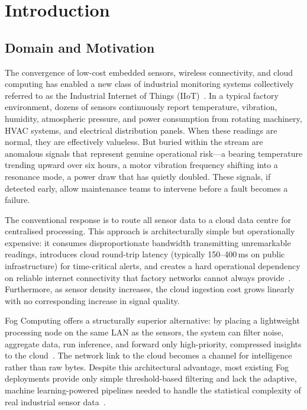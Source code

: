 \documentclass[conference]{IEEEtran}
\begin{document}
\section{Introduction}

\subsection{Domain and Motivation}

The convergence of low-cost embedded sensors, wireless connectivity, and
cloud computing has enabled a new class of industrial monitoring systems
collectively referred to as the Industrial Internet of Things
(IIoT)~\cite{b1}. In a typical factory environment, dozens of sensors
continuously report temperature, vibration, humidity, atmospheric pressure,
and power consumption from rotating machinery, HVAC systems, and electrical
distribution panels. When these readings are normal, they are effectively
valueless. But buried within the stream are anomalous signals that represent
genuine operational risk---a bearing temperature trending upward over six
hours, a motor vibration frequency shifting into a resonance mode, a power
draw that has quietly doubled. These signals, if detected early, allow
maintenance teams to intervene before a fault becomes a failure.

The conventional response is to route all sensor data to a cloud data
centre for centralised processing. This approach is architecturally simple
but operationally expensive: it consumes disproportionate bandwidth transmitting
unremarkable readings, introduces cloud round-trip latency (typically
150--400\,ms on public infrastructure) for time-critical alerts, and creates
a hard operational dependency on reliable internet connectivity that factory
networks cannot always provide~\cite{b2}. Furthermore, as sensor density
increases, the cloud ingestion cost grows linearly with no corresponding
increase in signal quality.

Fog Computing offers a structurally superior alternative: by placing a
lightweight processing node on the same LAN as the sensors, the system can
filter noise, aggregate data, run inference, and forward only high-priority,
compressed insights to the cloud~\cite{b3}. The network link to the cloud
becomes a channel for intelligence rather than raw bytes. Despite this
architectural advantage, most existing Fog deployments provide only simple
threshold-based filtering and lack the adaptive, machine learning-powered
pipelines needed to handle the statistical complexity of real industrial
sensor data~\cite{b4}.
\end{document}
